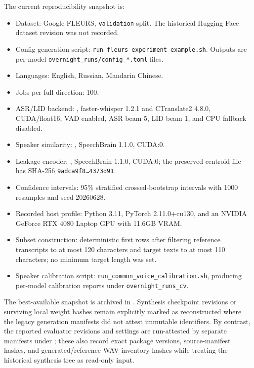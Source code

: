 \documentclass[11pt]{article}
\begin{document}
The current reproducibility snapshot is:
\begin{itemize}[leftmargin=1.5em]
    \item Dataset: Google FLEURS, \texttt{validation} split. The historical Hugging Face dataset revision was not recorded.
    \item Config generation script: \texttt{run\_fleurs\_experiment\_example.sh}. Outputs are per-model \texttt{overnight\_runs/config\_*.toml} files.
    \item Languages: English, Russian, Mandarin Chinese.
    \item Jobs per full direction: 100.
    \item ASR/LID backend: , faster-whisper 1.2.1 and CTranslate2 4.8.0, CUDA/float16, VAD enabled, ASR beam 5, LID beam 1, and CPU fallback disabled.
    \item Speaker similarity: , SpeechBrain 1.1.0, CUDA:0.
    \item Leakage encoder: , SpeechBrain 1.1.0, CUDA:0; the preserved centroid file has SHA-256 \texttt{9adca9f8\ldots4373d91}.
    \item Confidence intervals: 95\% stratified crossed-bootstrap intervals with 1000 resamples and seed 20260628.
    \item Recorded host profile: Python 3.11, PyTorch 2.11.0+cu130, and an NVIDIA GeForce RTX 4080 Laptop GPU with 11.6GB VRAM.
    \item Subset construction: deterministic first rows after filtering reference transcripts to at most 120 characters and target texts to at most 110 characters; no minimum target length was set.
    \item Speaker calibration script: \texttt{run\_common\_voice\_calibration.sh}, producing per-model calibration reports under \texttt{overnight\_runs\_cv}.
\end{itemize}
The best-available snapshot is archived in . Synthesis checkpoint revisions or surviving local weight hashes remain explicitly marked as reconstructed where the legacy generation manifests did not attest immutable identifiers. By contrast, the reported evaluator revisions and settings are run-attested by separate manifests under ; these also record exact package versions, source-manifest hashes, and generated/reference WAV inventory hashes while treating the historical synthesis tree as read-only input.
\end{document}

